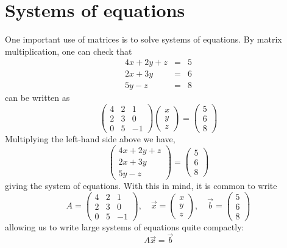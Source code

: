 \documentclass{ximera}
\begin{document}
\section{Systems of equations}



One important use of matrices is to solve systems of equations. By matrix multiplication, one can check that
\begin{eqnarray*}
4x+2y+z &=& 5\\
2x+3y &=& 6\\
5y -z &=& 8
\end{eqnarray*}
can be written as
\[
\begin{pmatrix}
4 & 2 & 1 \\
2 & 3 & 0\\
0 & 5 & -1
\end{pmatrix}
\begin{pmatrix}
x \\
y\\
z
\end{pmatrix}
= \begin{pmatrix}
5 \\
6\\
8
\end{pmatrix}
\]
Multiplying the left-hand side above we have,
\[
\begin{pmatrix}
4x+2y+z\\
2x+3y\\
5y-z
\end{pmatrix} = \begin{pmatrix}
5\\
6\\
8
\end{pmatrix}
\]
giving the system of equations. With this in mind, it is common to write
\[
A = \begin{pmatrix}
4 & 2 & 1 \\
2 & 3 & 0\\
0 & 5 & -1
\end{pmatrix},\quad\vec x = \begin{pmatrix} x \\ y \\ z\end{pmatrix},
  \quad\vec b = \begin{pmatrix} 5 \\6\\8\end{pmatrix}
\]
allowing us to write large systems of equations quite compactly:
\[
A\vec{x} = \vec{b}
\]
\end{document}

